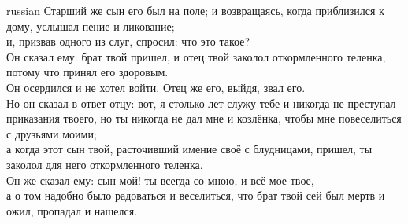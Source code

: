\documentclass[10pt]{article} %
\begin{document}
{\begin{minipage}[t]{0.45\textwidth}
\begin{otherlanguage*}{russian}
Старший же сын его был на поле; и возвращаясь, когда приблизился к дому, услышал пение и ликование;\\
и, призвав одного из слуг, спросил: что это такое?\\
Он сказал ему: брат твой пришел, и отец твой заколол откормленного теленка, потому что принял его здоровым.\\
Он осердился и не хотел войти. Отец же его, выйдя, звал его.\\
Но он сказал в ответ отцу: вот, я столько лет служу тебе и никогда не преступал приказания твоего, но ты никогда не дал мне и козлёнка, чтобы мне повеселиться с друзьями моими;\\
а когда этот сын твой, расточивший имение своё с блудницами, пришел, ты заколол для него откормленного теленка.\\
Он же сказал ему: сын мой! ты всегда со мною, и всё мое твое,\\
а о том надобно было радоваться и веселиться, что брат твой сей был мертв и ожил, пропадал и нашелся. \\
\end{otherlanguage*}
\end{minipage}
\hfill
\begin{minipage}[t]{0.45\textwidth}


\end{minipage}}
\end{document}
